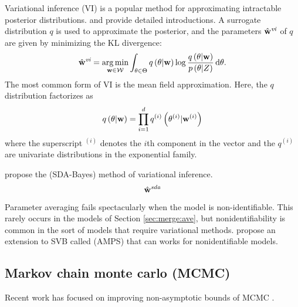 \documentclass[thesis.tex]{subfiles}
\newcommand{\q}[1]{q\left({#1}\right)}
\newcommand{\qi}[1]{q^{(i)}\left({#1}\right)}
\newcommand{\p}[1]{p\left({#1}\right)}
\newcommand{\wvi}{\hat\w^\textit{vi}}
\newcommand{\wsda}{\hat\w^\textit{sda}}
\begin{document}
Variational inference (VI) is a popular method for approximating intractable posterior distributions.
\cite{jordan1999introduction} and \cite{blei2017variational} provide detailed introductions.
A surrogate distribution $q$ is used to approximate the posterior,
and the parameters $\wvi$ of $q$ are given by minimizing the KL divergence: 
\begin{equation}
    \wvi = \argmin_{\w\in\W} \int_{\theta\in\Theta}\q{\theta | \w}\log\frac{\q{\theta | \w}}{\p{\theta | Z}}
    \dd\theta
    .
\end{equation}
The most common form of VI is the mean field approximation.
Here, the $q$ distribution factorizes as
\begin{equation}
    \q{\theta|\w} = \prod_{i=1}^d \qi{\theta^{(i)}|\w^{(i)}}
\end{equation}
where the superscript ${}^{(i)}$ denotes the $i$th component in the vector and
the $q^{(i)}$ are univariate distributions in the exponential family.

\citet{broderick2013streaming} propose the  (SDA-Bayes) method of variational inference.
\begin{equation}
    \wsda
\end{equation}

Parameter averaging fails spectacularly when the model is non-identifiable.
This rarely occurs in the models of Section \ref{sec:merge:ave}, 
but nonidentifiability is common in the sort of models that require variational methods.
\citet{campbell2014approximate} propose an extension to SVB called  (AMPS) that can works for nonidentifiable models.

\citet{neiswanger2015embarrassingly}


\subsection{Markov chain monte carlo (MCMC)}

Recent work has focused on improving non-asymptotic bounds of MCMC 
\citep[e.g.][]{latuszynski2013nonasymptotic,andrieu2015convergence,adamczak2015exponential,andrieu2016establishing}.
\end{document}
